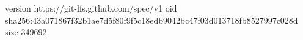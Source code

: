 version https://git-lfs.github.com/spec/v1
oid sha256:43a071867f32b1ae7d5f80f9f5c18edb9042bc47f03d013718fb8527997c028d
size 349692
